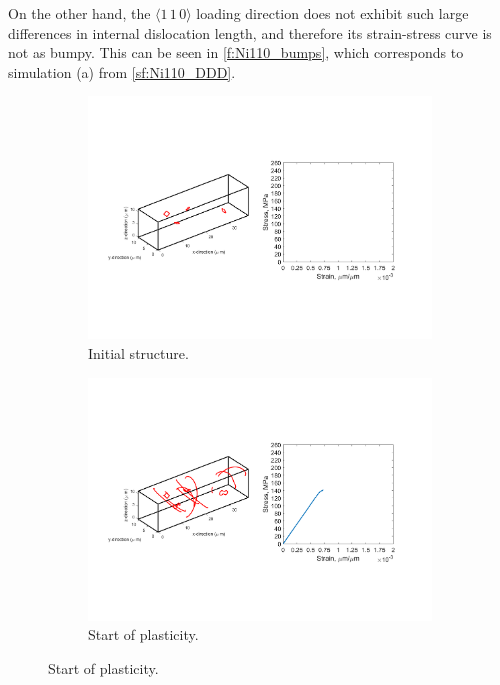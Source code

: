 On the other hand, the $\langle 1\, 1\, 0 \rangle$ loading direction does not exhibit such large differences in internal dislocation length, and therefore its strain-stress curve is not as bumpy. This can be seen in \cref{f:Ni110_bumps}, which corresponds to simulation (a) from \cref{sf:Ni110_DDD}.
\begin{figure}
    \centering
    \begin{subfigure}[t]{\linewidth}
        \centering
        \includegraphics[trim={1.75cm 5cm 2.5cm 5.5cm},clip,width=\linewidth]{../data/16-Mar-2021_4_tensile_ni_110_0.pdf}
        \caption{Initial structure.}
    \end{subfigure}

    \begin{subfigure}[t]{\linewidth}
        \centering
        \includegraphics[trim={1.75cm 5cm 2.5cm 5.5cm},clip,width=\linewidth]{../data/16-Mar-2021_4_tensile_ni_110_5400.pdf}
        \caption{Start of plasticity.}
    \end{subfigure}


\end{figure}

